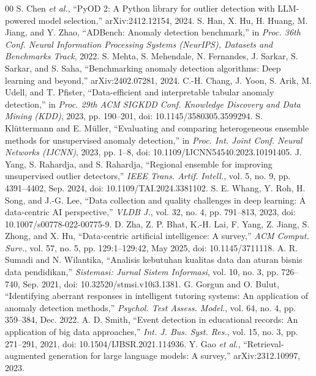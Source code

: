 \documentclass[conference]{IEEEtran}
\begin{document}
\begin{thebibliography}{00}
 S. Chen \textit{et al.}, ``PyOD 2: A Python library for outlier detection with LLM-powered model selection,'' arXiv:2412.12154, 2024.
 S. Han, X. Hu, H. Huang, M. Jiang, and Y. Zhao, ``ADBench: Anomaly detection benchmark,'' in \textit{Proc. 36th Conf. Neural Information Processing Systems (NeurIPS), Datasets and Benchmarks Track}, 2022.
 S. Mehta, S. Mehendale, N. Fernandes, J. Sarkar, S. Sarkar, and S. Saha, ``Benchmarking anomaly detection algorithms: Deep learning and beyond,'' arXiv:2402.07281, 2024.
 C.-H. Chang, J. Yoon, S. Arik, M. Udell, and T. Pfister, ``Data-efficient and interpretable tabular anomaly detection,'' in \textit{Proc. 29th ACM SIGKDD Conf. Knowledge Discovery and Data Mining (KDD)}, 2023, pp. 190--201, doi: 10.1145/3580305.3599294.
 S. Kl\"uttermann and E. M\"uller, ``Evaluating and comparing heterogeneous ensemble methods for unsupervised anomaly detection,'' in \textit{Proc. Int. Joint Conf. Neural Networks (IJCNN)}, 2023, pp. 1--8, doi: 10.1109/IJCNN54540.2023.10191405.
 J. Yang, S. Rahardja, and S. Rahardja, ``Regional ensemble for improving unsupervised outlier detectors,'' \textit{IEEE Trans. Artif. Intell.}, vol. 5, no. 9, pp. 4391--4402, Sep. 2024, doi: 10.1109/TAI.2024.3381102.
 S. E. Whang, Y. Roh, H. Song, and J.-G. Lee, ``Data collection and quality challenges in deep learning: A data-centric AI perspective,'' \textit{VLDB J.}, vol. 32, no. 4, pp. 791--813, 2023, doi: 10.1007/s00778-022-00775-9.
 D. Zha, Z. P. Bhat, K.-H. Lai, F. Yang, Z. Jiang, S. Zhong, and X. Hu, ``Data-centric artificial intelligence: A survey,'' \textit{ACM Comput. Surv.}, vol. 57, no. 5, pp. 129:1--129:42, May 2025, doi: 10.1145/3711118.
 A. R. Sumadi and N. Wilantika, ``Analisis kebutuhan kualitas data dan aturan bisnis data pendidikan,'' \textit{Sistemasi: Jurnal Sistem Informasi}, vol. 10, no. 3, pp. 726--740, Sep. 2021, doi: 10.32520/stmsi.v10i3.1381.
 G. Gorgun and O. Bulut, ``Identifying aberrant responses in intelligent tutoring systems: An application of anomaly detection methods,'' \textit{Psychol. Test Assess. Model.}, vol. 64, no. 4, pp. 359--384, Dec. 2022.
 A. D. Smith, ``Event detection in educational records: An application of big data approaches,'' \textit{Int. J. Bus. Syst. Res.}, vol. 15, no. 3, pp. 271--291, 2021, doi: 10.1504/IJBSR.2021.114936.
 Y. Gao \textit{et al.}, ``Retrieval-augmented generation for large language models: A survey,'' arXiv:2312.10997, 2023.
\end{thebibliography}
\end{document}
